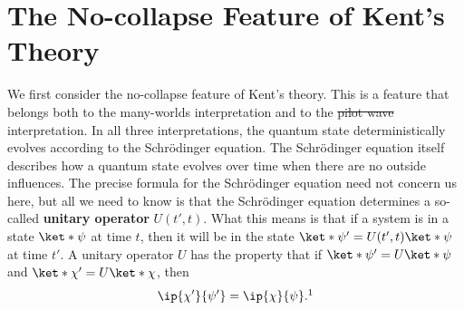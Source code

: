 \documentclass[12pt]{report}
\providecommand{\DIFadd}[1]{{\protect\color{blue}\uwave{#1}}} %
\providecommand{\DIFdel}[1]{{\protect\color{red}\sout{#1}}}                      %
\providecommand{\DIFaddbegin}{} %
\providecommand{\DIFaddend}{} %
\providecommand{\DIFdelbegin}{} %
\providecommand{\DIFdelend}{} %
\begin{document}
\section{The No-collapse Feature of Kent's Theory}
We first consider the no-collapse feature of Kent's theory. This is a feature that belongs both to the many-worlds interpretation and to the \DIFdelbegin \DIFdel{pilot wave }\DIFdelend \DIFaddbegin \DIFadd{Bohmian }\DIFaddend interpretation. In all three interpretations, the quantum state deterministically evolves according to the Schr\"{o}dinger equation. The Schr\"{o}dinger equation itself describes how a quantum state evolves over time when there are no outside influences. The precise formula for the Schr\"{o}dinger equation need not concern us here, but all we need to know is that the Schr\"{o}dinger equation determines a so-called \textbf{unitary operator} $U(t',t)$. %
%
What this means is that if a system is in a state $\ket*{\psi}$ at time $t$, then it will be in the state $\ket*{\psi'}=U(t',t)\ket*{\psi}$
at time $t'$. A unitary operator $U$ has the property that if $\ket*{\psi'}=U\ket*{\psi}$ and $\ket*{\chi'}=U\ket*{\chi}$, then 
\begin{equation}\label{unitarycond}
\ip{\chi'}{\psi'}=\ip{\chi}{\psi}.\protect\footnotemark
\end{equation} 
\end{document}
